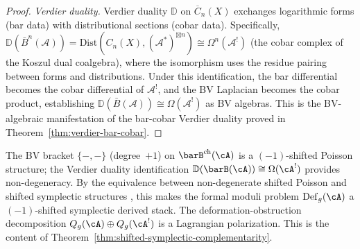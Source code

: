 \begin{proof}
\emph{Verdier duality.}  Verdier duality $\mathbb{D}$ on $\overline{C}_n(X)$ exchanges logarithmic forms (bar data) with distributional sections (cobar data).  Specifically, $\mathbb{D}(\bar{B}^n(\mathcal{A})) = \mathrm{Dist}(C_n(X), (\mathcal{A}^*)^{\boxtimes n}) \cong \Omega^n(\mathcal{A}^!)$ (the cobar complex of the Koszul dual coalgebra), where the isomorphism uses the residue pairing between forms and distributions.  Under this identification, the bar differential becomes the cobar differential of $\mathcal{A}^!$, and the BV Laplacian becomes the cobar product, establishing $\mathbb{D}(\bar{B}(\mathcal{A})) \cong \Omega(\mathcal{A}^!)$ as BV algebras.  This is the BV-algebraic manifestation of the bar-cobar Verdier duality proved in Theorem~\ref{thm:verdier-bar-cobar}.
\end{proof}

\begin{remark}\label{rem:bv-shifted-symplectic}
The BV bracket $\{-,-\}$ (degree~$+1$) on $\barB^{\mathrm{ch}}(\cA)$
is a $(-1)$-shifted Poisson structure; the Verdier duality
identification $\mathbb{D}(\barB(\cA)) \cong \Omega(\cA^!)$
provides non-degeneracy.  By the equivalence between non-degenerate
shifted Poisson and shifted symplectic structures
\cite{CPTVV17}, this makes the formal moduli problem
$\mathrm{Def}_g(\cA)$ a $(-1)$-shifted symplectic derived stack.
The deformation-obstruction decomposition
$Q_g(\cA) \oplus Q_g(\cA^!)$ is a Lagrangian polarization.
This is the content of
Theorem~\ref{thm:shifted-symplectic-complementarity}.
\end{remark}
